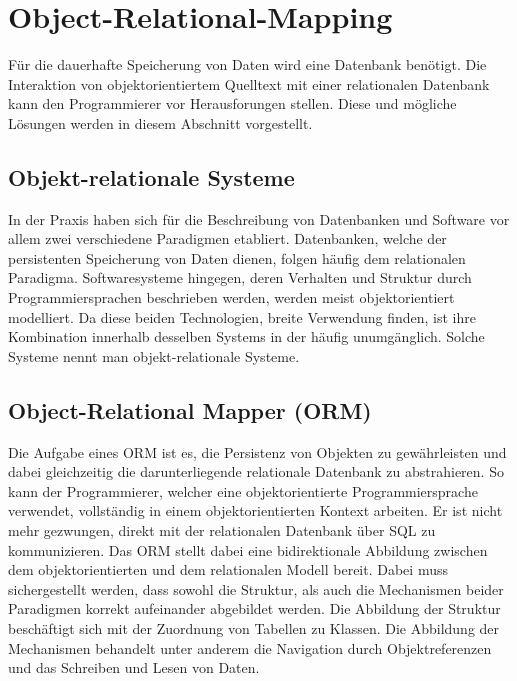 \section{Object-Relational-Mapping}

Für die dauerhafte Speicherung von Daten wird eine Datenbank benötigt. Die Interaktion von objektorientiertem Quelltext mit einer relationalen Datenbank kann den Programmierer vor Herausforungen stellen. Diese und mögliche Lösungen werden in diesem Abschnitt vorgestellt.

\subsection{Objekt-relationale Systeme}
In der Praxis haben sich für die Beschreibung von Datenbanken und Software vor allem zwei verschiedene Paradigmen etabliert. Datenbanken, welche der persistenten Speicherung von Daten dienen, folgen häufig dem relationalen Paradigma. Softwaresysteme hingegen, deren Verhalten und Struktur durch Programmiersprachen beschrieben werden, werden meist objektorientiert modelliert. Da diese beiden Technologien, breite Verwendung finden, ist ihre Kombination innerhalb desselben Systems in der häufig unumgänglich. Solche Systeme nennt man objekt-relationale Systeme. \cite{ireland_understanding_2009}

\subsection{Object-Relational Mapper (ORM)}
Die Aufgabe eines ORM ist es, die Persistenz von Objekten zu gewährleisten \cite{noauthor_what_2023} und dabei gleichzeitig die darunterliegende relationale Datenbank zu abstrahieren. So kann der Programmierer, welcher eine objektorientierte Programmiersprache verwendet, vollständig in einem objektorientierten Kontext arbeiten. Er ist nicht mehr gezwungen, direkt mit der relationalen Datenbank über SQL zu kommunizieren. Das ORM stellt dabei eine bidirektionale Abbildung zwischen dem objektorientierten und dem relationalen Modell bereit. Dabei muss sichergestellt werden, dass sowohl die Struktur, als auch die Mechanismen beider Paradigmen korrekt aufeinander abgebildet werden. Die Abbildung der Struktur beschäftigt sich mit der Zuordnung von Tabellen zu Klassen. Die Abbildung der Mechanismen behandelt unter anderem die Navigation durch Objektreferenzen und das Schreiben und Lesen von Daten. \cite{ireland_understanding_2009}

